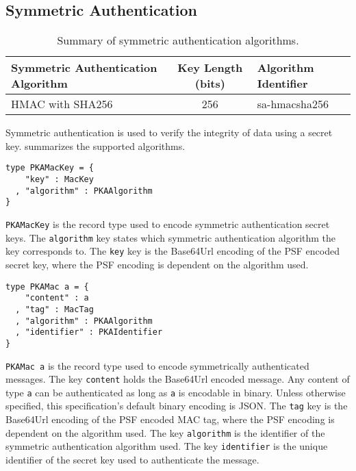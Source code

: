 \documentclass{article}
\newcommand{\todo}[1]{\textcolor{red}{#1}}
\begin{document}
%
%
%
%

\subsection{Symmetric Authentication}

\begin{table}
\begin{center}
\begin{tabular}{| l | c | l |}
\hline
Symmetric Authentication Algorithm & Key Length (bits) & Algorithm Identifier \\ 
\hline
HMAC with SHA256 & 256 & sa-hmacsha256 \\
\hline
\end{tabular}
\end{center}
\caption{Summary of symmetric authentication algorithms.}
\label{table:symmetric_auth_alg}
\end{table}

Symmetric authentication is used to verify the integrity of data using a secret key. 
 summarizes the supported algorithms. 

\begin{lstlisting}
type PKAMacKey = {
    "key" : MacKey
  , "algorithm" : PKAAlgorithm
}
\end{lstlisting}

\texttt{PKAMacKey} is the record type used to encode symmetric authentication secret keys. 
The \texttt{algorithm} key states which symmetric authentication algorithm the key corresponds to. 
The \texttt{key} key is the Base64Url encoding of the PSF encoded secret key, where the PSF encoding is dependent on the algorithm used. 

\begin{lstlisting}
type PKAMac a = {
    "content" : a
  , "tag" : MacTag
  , "algorithm" : PKAAlgorithm
  , "identifier" : PKAIdentifier
}
\end{lstlisting}

\texttt{PKAMac a} is the record type used to encode symmetrically authenticated messages. 
The key \texttt{content} holds the Base64Url encoded message. 
Any content of type \texttt{a} can be authenticated as long as \texttt{a} is encodable in binary. 
Unless otherwise specified, this specification's default binary encoding is JSON. 
The \texttt{tag} key is the Base64Url encoding of the PSF encoded MAC tag, where the PSF encoding is dependent on the algorithm used. 
The key \texttt{algorithm} is the identifier of the symmetric authentication algorithm used. 
The key \texttt{identifier} is the unique identifier of the secret key used to authenticate the message. 
\end{document}
